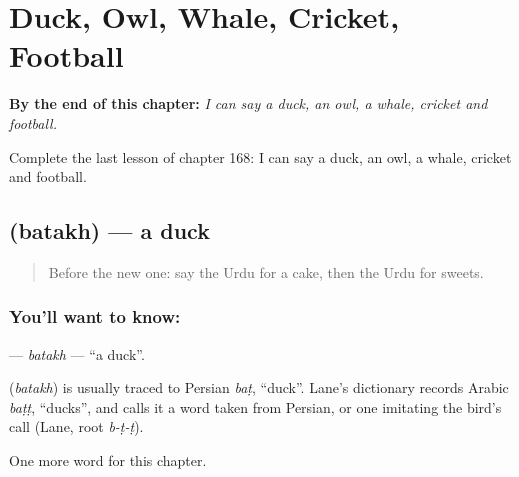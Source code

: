 
\chapter{Duck, Owl, Whale, Cricket, Football}
\label{ch:ur-duck-owl-whale-cricket-football}

\begin{chapteropening}
\textbf{By the end of this chapter:} \emph{I can say a duck, an owl, a whale, cricket and football.}

Complete the last lesson of chapter 168: I can say a duck, an owl, a whale, cricket and football.
\end{chapteropening}

\section[\texorpdfstring{\ur{بطخ} (batakh)}{بطخ (batakh)}]{ (batakh) — a duck}

\label{lesson:UR-C168-batakh}



\begin{quote}
Before the new one: say the Urdu for a cake, then the Urdu for sweets.
\end{quote}

\subsection*{You'll want to know: }
\textbf{} — \emph{batakh} — \textquotedblleft{}a duck\textquotedblright{}.

\begin{cousinweb}
\textbf{} (\emph{batakh}) is usually traced to Persian \emph{baṭ}, \textquotedblleft{}duck\textquotedblright{}. Lane's dictionary records Arabic \emph{baṭṭ}, \textquotedblleft{}ducks\textquotedblright{}, and calls it a word taken from Persian, or one imitating the bird's call (Lane, root \emph{b-ṭ-ṭ}).
\end{cousinweb}

\begin{grammarlens}[title={What you've built}]
One more word for this chapter.
\end{grammarlens}

